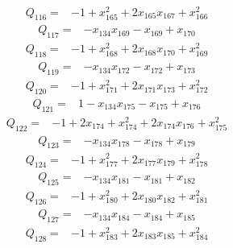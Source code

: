 \documentclass[11pt]{article}
\theoremstyle{definition}\newtheorem{definition}[theorem]{Definition}
\begin{document}
{\begin{align*}
\end{align*}
\begin{align*}
 Q_{116}={}&-1 +x_{165}^{2} +2x_{165}x_{167} +x_{166}^{2}
\end{align*}
\begin{align*}
 Q_{117}={}&-x_{134}x_{169} -x_{169} +x_{170}
\end{align*}
\begin{align*}
 Q_{118}={}&-1 +x_{168}^{2} +2x_{168}x_{170} +x_{169}^{2}
\end{align*}
\begin{align*}
 Q_{119}={}&-x_{134}x_{172} -x_{172} +x_{173}
\end{align*}
\begin{align*}
 Q_{120}={}&-1 +x_{171}^{2} +2x_{171}x_{173} +x_{172}^{2}
\end{align*}
\begin{align*}
 Q_{121}={}&1 -x_{134}x_{175} -x_{175} +x_{176}
\end{align*}
\begin{align*}
 Q_{122}={}&-1 +2x_{174} +x_{174}^{2} +2x_{174}x_{176} +x_{175}^{2}
\end{align*}
\begin{align*}
 Q_{123}={}&-x_{134}x_{178} -x_{178} +x_{179}
\end{align*}
\begin{align*}
 Q_{124}={}&-1 +x_{177}^{2} +2x_{177}x_{179} +x_{178}^{2}
\end{align*}
\begin{align*}
 Q_{125}={}&-x_{134}x_{181} -x_{181} +x_{182}
\end{align*}
\begin{align*}
 Q_{126}={}&-1 +x_{180}^{2} +2x_{180}x_{182} +x_{181}^{2}
\end{align*}
\begin{align*}
 Q_{127}={}&-x_{134}x_{184} -x_{184} +x_{185}
\end{align*}
\begin{align*}
 Q_{128}={}&-1 +x_{183}^{2} +2x_{183}x_{185} +x_{184}^{2}

\end{align*}}
\end{document}
